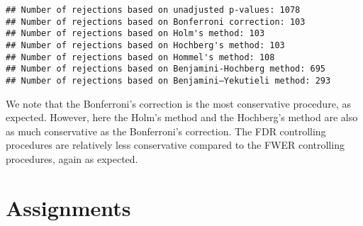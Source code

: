 \documentclass[
]{book}
\begin{document}
\begin{verbatim}
## Number of rejections based on unadjusted p-values: 1078
## Number of rejections based on Bonferroni correction: 103
## Number of rejections based on Holm's method: 103
## Number of rejections based on Hochberg's method: 103
## Number of rejections based on Hommel's method: 108
## Number of rejections based on Benjamini-Hochberg method: 695
## Number of rejections based on Benjamini–Yekutieli method: 293
\end{verbatim}

We note that the Bonferroni's correction is the most conservative procedure, as expected. However, here the Holm's method and the Hochberg's method are also as much conservative as the Bonferroni's correction. The FDR controlling procedures are relatively less conservative compared to the FWER controlling procedures, again as expected.

\hypertarget{assignments}{%
\chapter{Assignments}\label{assignments}}
\end{document}
